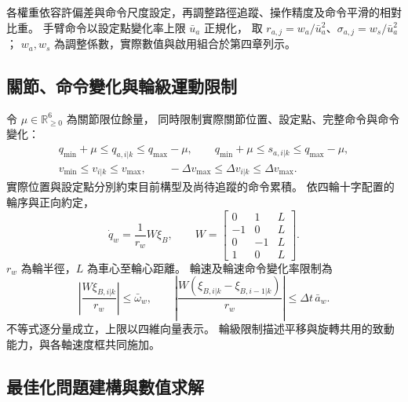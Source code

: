 各權重依容許偏差與命令尺度設定，再調整路徑追蹤、操作精度及命令平滑的相對比重。
手臂命令以設定點變化率上限 $\bar u_a$ 正規化，
取 $r_{a,j}=w_a/\bar u_a^2$、$\sigma_{a,j}=w_s/\bar u_a^2$；
$w_a,w_s$ 為調整係數，實際數值與啟用組合於第四章列示。

\subsection{關節、命令變化與輪級運動限制}
\label{subsec:joint_command_wheel_constraints}

令 $\mu\in\mathbb R_{\geq0}^6$ 為關節限位餘量，
同時限制實際關節位置、設定點、完整命令與命令變化：
\begin{equation}
    \begin{gathered}
        q_{\min}+\mu\leq q_{a,i|k}\leq q_{\max}-\mu,\qquad
        q_{\min}+\mu\leq s_{a,i|k}\leq q_{\max}-\mu,\\
        v_{\min}\leq v_{i|k}\leq v_{\max},\qquad
        -\Delta v_{\max}\leq\Delta v_{i|k}\leq\Delta v_{\max}.
    \end{gathered}
    \label{eq:ch3_joint_command_limits}
\end{equation}
實際位置與設定點分別約束目前構型及尚待追蹤的命令累積。
依四輪十字配置的輪序與正向約定，
\begin{equation}
    \dot q_w=\frac{1}{r_w}W\xi_B,\qquad
    W=
    \begin{bmatrix}
        0&1&L\\-1&0&L\\0&-1&L\\1&0&L
    \end{bmatrix}.
    \label{eq:ch3_wheel_command_mapping}
\end{equation}
$r_w$ 為輪半徑，$L$ 為車心至輪心距離。
輪速及輪速命令變化率限制為
\begin{equation}
    \left|\frac{W\xi_{B,i|k}}{r_w}\right|\leq\bar\omega_w,\qquad
    \left|\frac{W(\xi_{B,i|k}-\xi_{B,i-1|k})}{r_w}\right|
    \leq\Delta t\,\bar a_w .
    \label{eq:ch3_wheel_speed_acceleration_limits}
\end{equation}
不等式逐分量成立，上限以四維向量表示。
輪級限制描述平移與旋轉共用的致動能力，與各軸速度框共同施加。

\subsection{最佳化問題建構與數值求解}
\label{subsec:wholebody_qp_formulation}

